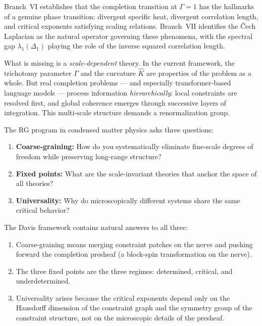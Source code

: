 \documentclass[11pt,letterpaper]{article}
\newcommand{\Khat}{\hat{K}}
\begin{document}
Branch~VI establishes that the completion transition at $\Gamma = 1$ 
has the hallmarks of a genuine phase transition: divergent specific 
heat, divergent correlation length, and critical exponents satisfying 
scaling relations. Branch~VII identifies the \v{C}ech Laplacian as 
the natural operator governing these phenomena, with the spectral 
gap $\lambda_1(\Delta_1)$ playing the role of the inverse squared 
correlation length.

What is missing is a \emph{scale-dependent} theory. In the current 
framework, the trichotomy parameter $\Gamma$ and the curvature 
$\Khat$ are properties of the problem as a whole. But real 
completion problems --- and especially transformer-based language 
models --- process information \emph{hierarchically}: local 
constraints are resolved first, and global coherence emerges through 
successive layers of integration. This multi-scale structure demands 
a renormalization group.

The RG program in condensed matter physics asks three questions:

\begin{enumerate}
    \item \textbf{Coarse-graining:} How do you systematically 
    eliminate fine-scale degrees of freedom while preserving 
    long-range structure?
    
    \item \textbf{Fixed points:} What are the scale-invariant 
    theories that anchor the space of all theories?
    
    \item \textbf{Universality:} Why do microscopically different 
    systems share the same critical behavior?
\end{enumerate}

The Davis framework contains natural answers to all three:

\begin{enumerate}
    \item Coarse-graining means merging constraint patches on the 
    nerve and pushing forward the completion presheaf (a 
    block-spin transformation on the nerve).
    
    \item The three fixed points are the three regimes: determined, 
    critical, and underdetermined.
    
    \item Universality arises because the critical exponents depend 
    only on the Hausdorff dimension of the constraint graph and 
    the symmetry group of the constraint structure, not on the 
    microscopic details of the presheaf.
\end{enumerate}
\end{document}
